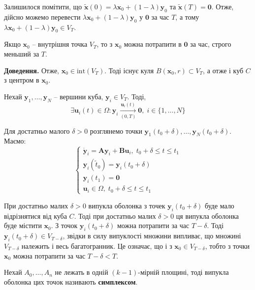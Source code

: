 \documentclass[14pt]{extarticle}
\newcommand{\<}{\langle}
\renewcommand{\>}{\rangle}
\theoremstyle{mystyle}{\newtheorem{definition}{Definition}[section]}
\theoremstyle{mystyle}{\newtheorem{proposition}[definition]{Proposition}}
\theoremstyle{mystyle}{\newtheorem{theorem}[definition]{Theorem}}
\theoremstyle{mystyle}{\newtheorem{lemma}[definition]{Lemma}}
\theoremstyle{mystyle}{\newtheorem{corollary}[definition]{Corollary}}
\theoremstyle{mystyle}{\newtheorem*{remark}{Remark}}
\theoremstyle{mystyle}{\newtheorem*{remarks}{Remarks}}
\theoremstyle{mystyle}{\newtheorem*{example}{Example}}
\theoremstyle{mystyle}{\newtheorem*{examples}{Examples}}
\theoremstyle{definition}{\newtheorem*{exercise}{Exercise}}
\theoremstyle{cstyle}{\newtheorem*{cthm}{}}
\theoremstyle{warn}
\begin{document}
Залишилося помітити, що $\widetilde{\mathbf{x}}(0) = \lambda\mathbf{x}_0+(1-\lambda)\mathbf{y}_0$ та $\widetilde{\mathbf{x}}(T) = \mathbf{0}$. Отже, дійсно можемо перевести 
$\lambda\mathbf{x}_0+(1-\lambda)\mathbf{y}_0$ у $\mathbf{0}$ за час $T$, а тому $\lambda\mathbf{x}_0+(1-\lambda)\mathbf{y}_0 \in V_T$.

\begin{lemma}
    Якщо $\mathbf{x}_0$ -- внутрішня точка $V_T$, то з $\mathbf{x}_0$ можна потрапити в $\mathbf{0}$ за час, строго меньший за $T$.
\end{lemma}

\textbf{Доведення.} Отже, $\mathbf{x}_0 \in \text{int}(V_T)$. Тоді існує куля $B(\mathbf{x}_0,r) \subset V_T$, а отже і куб $C$ з центром в $\mathbf{x}_0$. 

Нехай $\mathbf{y}_1,\dots,\mathbf{y}_N$ -- вершини куба, $\mathbf{y}_i \in V_T$. Тоді, 
\begin{equation}
    \exists \mathbf{u}_i(t) \in \Omega: \mathbf{y}_i \xrightarrow[(0,T)]{\mathbf{u}_i(t)} \mathbf{0}, \; i \in \{1,\dots,N\}
\end{equation}

Для достатньо малого $\delta>0$ розглянемо точки $\mathbf{y}_1(t_0+\delta),\dots,\mathbf{y}_N(t_0+\delta)$. Маємо:
\begin{equation}
    \begin{cases}
        \dot{\mathbf{y}}_i = \boldsymbol{A}\mathbf{y}_i + \boldsymbol{B}\mathbf{u}_i, \; t_0+\delta \leq t \leq t_1 \\
        \mathbf{y}_i(\widetilde{t}_0) = \mathbf{y}_i(t_0+\delta) \\
        \mathbf{y}_i(t_1) = \mathbf{0} \\
        \mathbf{u}_i \in \Omega, \; t_0+\delta \leq t \leq t_1
    \end{cases}
\end{equation}

При достатньо малих $\delta>0$ випукла оболонка з точек $\mathbf{y}_i(t_0+\delta)$ буде мало відрізнятися від куба $C$. Тоді при достатньо 
малих $\delta>0$ ця випукла оболонка буде містити $\mathbf{x}_0$. З точок $\mathbf{y}_i(t_0+\delta)$ можна потрапити за час $T-\delta$. Тоді $\mathbf{y}_i(t_0+\delta) \in V_{T-\delta}$, звідки 
в силу випуклості множини випливає, що множині $V_{T-\delta}$ належить і весь багатогранник. Це означає, що і з $\mathbf{x}_0 \in V_{T-\delta}$, тобто з точки $\mathbf{x}_0$ можна потрапити за час $T-\delta < T$. 

\begin{definition}
    Нехай $A_0,\dots,A_n$ не лежать в одній $(k-1)$-мірній площині, тоді випукла оболонка цих точок називають \textbf{симплексом}.
\end{definition}
\end{document}
